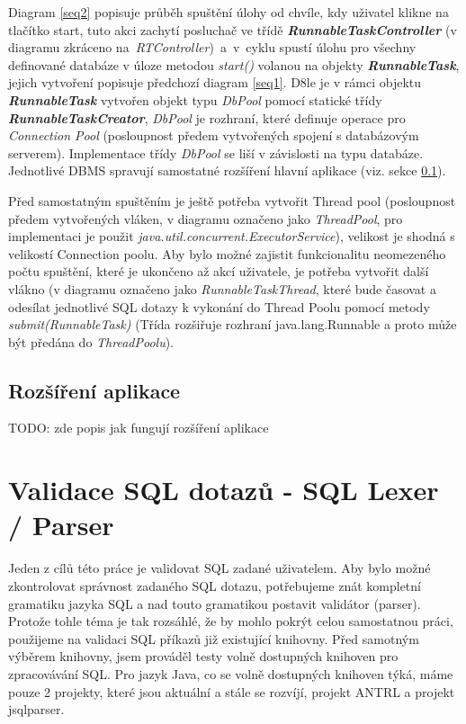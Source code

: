 \documentclass[czech,bachelor,public,dept460,male,cpdeclaration,twoside]{diploma}
\begin{document}
Diagram \ref{seq2} popisuje průběh spuštění úlohy od chvíle, kdy uživatel klikne na tlačítko start, tuto akci zachytí posluchač ve třídě \textbf{\emph{RunnableTaskController}} (v diagramu zkráceno na~\textit{RTController})~a~v~cyklu spustí úlohu pro všechny definované databáze v úloze metodou \textit{start()} volanou na objekty \textbf{\emph{RunnableTask}}, jejich vytvoření popisuje předchozí diagram \ref{seq1}. D8le je v rámci objektu \textbf{\emph{RunnableTask}} vytvořen objekt typu \textit{DbPool} pomocí statické třídy \textbf{\emph{RunnableTaskCreator}}, \textit{DbPool} je rozhraní, které definuje operace pro \textit{Connection Pool} (posloupnost předem vytvořených spojení s databázovým serverem). Implementace třídy \textit{DbPool} se liší v závislosti na typu databáze. Jednotlivé DBMS spravují samostatné rozšíření hlavní aplikace (viz. sekce \ref{plugins}).


Před samostatným spuštěním je ještě potřeba vytvořit Thread pool (posloupnost předem vytvořených vláken, v diagramu označeno jako \textit{ThreadPool}, pro implementaci je použit \newline \textit{java.util.concurrent.ExecutorService}), velikost je shodná s velikostí Connection poolu. Aby bylo možné zajistit funkcionalitu neomezeného počtu spuštění, které je ukončeno až akcí uživatele, je potřeba vytvořit další vlákno (v diagramu označeno jako \textit{RunnableTaskThread}, které bude časovat a odesílat jednotlivé SQL dotazy k vykonání do Thread Poolu pomocí metody \textit{submit(RunnableTask)} (Třída rozšiřuje rozhraní java.lang.Runnable a proto může být předána do \textit{ThreadPoolu}).













\subsection{Rozšíření aplikace} \label{plugins}

TODO:
zde popis jak fungují rozšíření aplikace




\newpage
\section{Validace SQL dotazů - SQL Lexer / Parser}
Jeden z cílů této práce je validovat SQL zadané uživatelem. Aby bylo možné zkontrolovat správnost zadaného SQL dotazu, potřebujeme znát kompletní gramatiku jazyka SQL a nad touto gramatikou postavit validátor (parser). Protože tohle téma je tak rozsáhlé, že by mohlo pokrýt celou samostatnou práci, použijeme na validaci SQL příkazů již existující knihovny. Před samotným výběrem knihovny, jsem prováděl testy volně dostupných knihoven pro zpracovávání SQL. Pro jazyk Java, co se volně dostupných knihoven týká, máme pouze 2 projekty, které jsou aktuální a stále se rozvíjí, projekt ANTRL a projekt jsqlparser.
\end{document}
